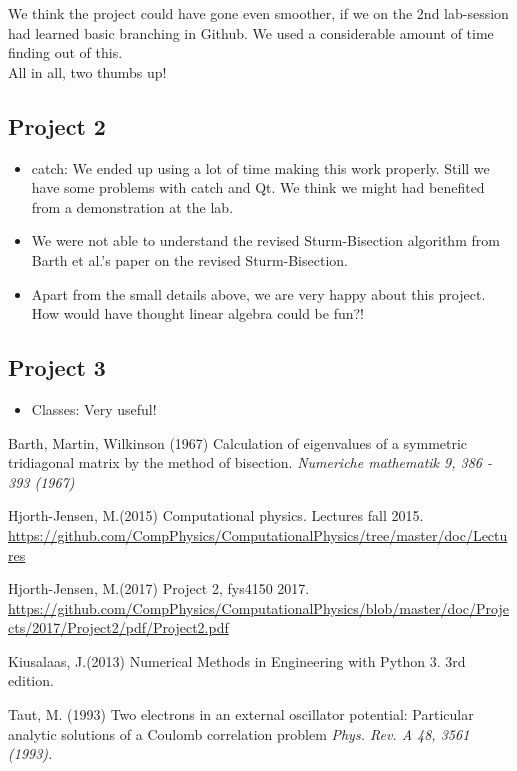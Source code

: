 \documentclass{article}
\begin{document}
We think the project could have gone even smoother, if we on the 2nd lab-session had learned basic branching in Github. We used a considerable amount of time finding out of this.\\

All in all, two thumbs up!

\subsection{Project 2}
\begin{itemize}
	\item  catch: We ended up using a lot of time making this work properly. Still we have some problems with catch and Qt. We think we might had benefited from a demonstration at the lab.
	
	\item We were not able to understand the revised Sturm-Bisection algorithm from Barth et al.'s \cite{barth} paper on the revised Sturm-Bisection. 
	
	\item Apart from the small details above, we are very happy about this project. How would have thought linear algebra could be fun?!
\end{itemize}

\subsection{Project 3}
\begin{itemize}
	\item  Classes: Very useful!
\end{itemize}













\pagebreak
\begin{thebibliography}{9}
	Barth, Martin, Wilkinson (1967)
	Calculation of eigenvalues of a symmetric tridiagonal matrix by the method of bisection. \textit{Numeriche mathematik 9, 386 - 393 (1967)}
	
	Hjorth-Jensen, M.(2015)
	Computational physics. Lectures fall 2015. 
	\url{https://github.com/CompPhysics/ComputationalPhysics/tree/master/doc/Lectures}
	
	Hjorth-Jensen, M.(2017)
	Project 2, fys4150 2017.
	\url{https://github.com/CompPhysics/ComputationalPhysics/blob/master/doc/Projects/2017/Project2/pdf/Project2.pdf}
	
	Kiusalaas, J.(2013)
	Numerical Methods in Engineering with Python 3. 3rd edition.
	
	Taut, M. (1993)
	Two electrons in an external oscillator potential: Particular analytic solutions of a Coulomb correlation problem \textit{Phys. Rev. A 48, 3561 (1993).}
	
	


\end{thebibliography}
\end{document}
